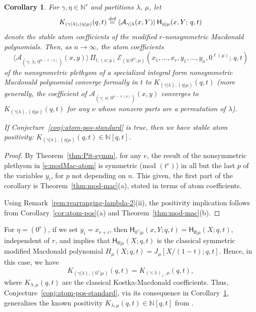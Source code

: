 \documentclass[12pt]{amsart}
\newtheorem{cor}[thm]{Corollary}
\theoremstyle{definition}
\theoremstyle{remark}
\newcommand{\NN}{{\mathbb N}}
\newcommand{\Acal}{{\mathcal A}}
\newcommand{\Ecal}{{\mathcal E}}
\newcommand{\defeq}{\mathrel{\overset{\text{{\rm def}}}{=}}}
\newcommand{\mE}{\mathsf H}   %
\begin{document}
\begin{cor}\label{cor:stable-mac-atom-pos}
For $\gamma ,\eta \in \NN ^{r}$ and partitions $\lambda $, $\mu $, let
\begin{equation}\label{e:cor stable-atom-coefs}
K_{(\gamma |\lambda ),(\eta |\mu )}(q,t) \defeq \langle \Acal _{\gamma
|\lambda }(x,Y) \rangle\, \mE _{\eta |\mu }(x,Y;\, q,t)
\end{equation}
denote the stable atom coefficients of the modified
$r$-nonsymmetric Macdonald polynomials.  Then, as $n\rightarrow
\infty $, the atom coefficients
\begin{equation}\label{e:modMac-atom}
\langle \Acal _{(\gamma ;\, \lambda ;\, 0^{n-\ell (\lambda )} )}(x,y)
\rangle \, \Pi _{t,(x;y)}\, \Ecal _{(\eta ;0^{n};\mu )}(x_{1},\ldots,
x_{r}, y_{1},\ldots,y_{n}, 0^{\ell (\mu )};\, q,t)
\end{equation}
of the nonsymmetric plethysm of a specialized integral form
nonsymmetric Macdonald polynomial converge formally in $t$ to
$K_{(\gamma |\lambda ),(\eta |\mu )}(q,t)$ (more generally, the
coefficient of $\Acal _{(\gamma ;\, \nu ;\,  0^{n-\ell (\nu )})}(x,y) $
converges to $K_{(\gamma |\lambda ),(\eta |\mu )}(q,t)$ for any $\nu $
whose nonzero parts are a permutation of $\lambda $).

If Conjecture~\ref{conj:atom-pos-standard} is true, then we have {\em
stable atom positivity:} $K_{(\gamma |\lambda ),(\eta |\mu )}(q,t)\in
\NN [q,t]$.
\end{cor}

\begin{proof}
By Theorem~\ref{thm:Pit-symm}, for any $e$, the result of the
nonsymmetric plethysm in \eqref{e:modMac-atom} is symmetric (mod
$(t^{e})$) in all but the last $p$ of the variables $y_{i}$, for $p$
not depending on $n$.  This given, the first part of the corollary is
Theorem~\ref{thm:mod-mac}(a), stated in terms of atom coefficients.

Using Remark~\ref{rem:rearranging-lambda-2}(ii), the positivity
implication follows from Corollary~\ref{cor:atom-pos}(a) and
Theorem~\ref{thm:mod-mac}(b).
\end{proof}

For $\eta =(0^{r})$, if we set $y_{i} = x_{r+i}$, then $\mE
_{0^{r}|\mu }(x,Y;q,t) = \mE _{\emptyset |\mu }(X; q,t)$, independent
of $r$, and \cite[Theorem~5.2.1]{HagHaiLo08} implies that $\mE
_{\emptyset |\mu }(X; q,t)$ is the classical symmetric modified
Macdonald polynomial $H_{\mu }(X; q,t) = J_{\mu }[X /(1-t);q,t]$.
Hence, in this case, we have
\begin{equation}\label{e:K-lam-mu-classical}
K_{(\gamma |\lambda ),(0^{r} |\mu )}(q,t) = K_{(\gamma ;\lambda
)_{+}, \mu }(q,t),
\end{equation}
where $K_{\lambda ,\mu }(q,t)$ are the classical Kostka-Macdonald
coefficients.  Thus, Conjecture~\ref{conj:atom-pos-standard}, via its
consequence in Corollary~\ref{cor:stable-mac-atom-pos}, generalizes
the known positivity $K_{\lambda ,\mu }(q,t)\in \NN [q,t]$ from
\cite{Haiman01}.
\end{document}
